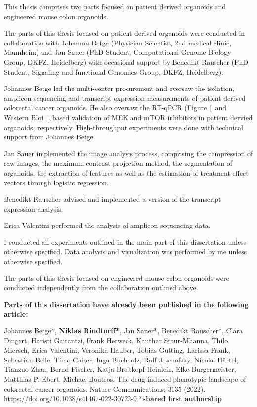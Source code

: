 This thesis comprises two parts focused on patient derived organoids and engineered mouse colon organoids. 
\smallbreak

The parts of this thesis focused on patient derived organoids were conducted in collaboration with Johannes Betge (Physician Scientist, 2nd medical clinic, Mannheim) and Jan Sauer (PhD Student, Computational Genome Biology Group, DKFZ, Heidelberg) with occasional support by Benedikt Rauscher (PhD Student, Signaling and functional Genomics Group, DKFZ, Heidelberg). \par
Johannes Betge led the multi-center procurement and oversaw the isolation, amplicon sequencing and transcript expression measurements of patient derived colorectal cancer organoids. He also oversaw the RT-qPCR (Figure \ref{} and Western Blot \ref{} based validation of MEK and mTOR inhibitors in patient dervied organoids, respectively. High-throughput experiments were done with technical support from Johannes Betge. \par
Jan Sauer implemented the image analysis process, comprising the compression of raw images, the maximum contrast projection method, the segmentation of organoids, the extraction of features as well as the estimation of treatment effect vectors through logistic regression. \par
Benedikt Rauscher advised and implemented a version of the transcript expression analysis. \par
Erica Valentini performed the analysis of amplicon sequencing data. \par
I conducted all experiments outlined in the main part of this dissertation unless otherwise specified. Data analysis and visualization was performed by me unless otherwise specified. 
\smallbreak

The parts of this thesis focused on engineered mouse colon organoids were conducted independently from the collaboration outlined above.
\smallbreak

\textbf{Parts of this dissertation have already been published in the following article:}

Johannes Betge*, \textbf{Niklas Rindtorff*}, Jan Sauer*, Benedikt Rauscher*, Clara Dingert, Haristi Gaitantzi, Frank Herweck, Kauthar Srour-Mhanna, Thilo Miersch, Erica Valentini, Veronika Hauber, Tobias Gutting, Larissa Frank, Sebastian Belle, Timo Gaiser, Inga Buchholz, Ralf Jesenofsky, Nicolai Härtel, Tianzuo Zhan, Bernd Fischer, Katja Breitkopf-Heinlein, Elke Burgermeister, Matthias P. Ebert, Michael Boutros, The drug-induced phenotypic landscape of colorectal cancer organoids. Nature Communications; 3135 (2022). https://doi.org/10.1038/s41467-022-30722-9 *\textbf{shared first authorship}

